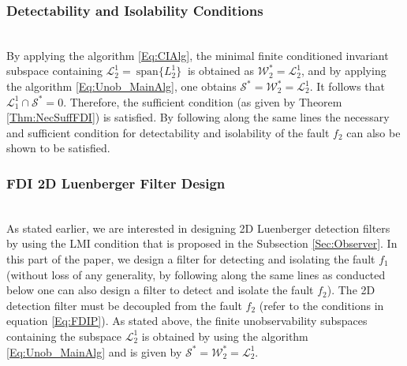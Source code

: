 \documentclass[journal,12pt,draftcls,onecolumn]{IEEEtran}
\newcommand{\ssp}[1]{\mathscr{#1}}      \newcommand{\setssp}[1]{\mathfrak{#1}}   \newcommand{\fld}[1]{\mathbb{#1}}       \newcommand{\op}[1]{\mathcal{#1}}       \newcommand{\sumbanach}[1]{\sum{#1}}
\newcommand{\spanset}[1]{\ \mathrm{span}\{#1\}\ } \newcommand{\idv}{{\bf x}_{-\infty}^\infty}				\newcommand{\fdv}{{\bf x}}
\begin{document}
\subsubsection{Detectability and Isolability Conditions}\ \\
By applying the algorithm \eqref{Eq:CIAlg}, the minimal finite conditioned invariant subspace containing $\ssp{L_2^1}=\spanset{L_2^1}$ is obtained as $\ssp{W}_{2}^* = \ssp{L}_2^1$, and by applying the algorithm \eqref{Eq:Unob_MainAlg}, one obtains $\op{S}^*=\ssp{W}_{2}^*=\ssp{L}_2^1$. It follows that $\ssp{L}_1^1\cap\op{S}^* =0$. Therefore, the sufficient condition (as given by Theorem \ref{Thm:NecSuffFDI}) is satisfied. By following along the same lines the necessary and sufficient condition for detectability and isolability of the fault $f_2$ can also be shown to be satisfied.


\subsubsection{FDI 2D Luenberger Filter Design}\ \\
As stated earlier, we are interested in designing 2D Luenberger detection filters by using the LMI condition that is proposed in the Subsection \ref{Sec:Observer}. In this part of the paper, we design a filter for detecting and isolating the fault $f_1$ (without loss of any generality, by following along the same lines as conducted below one can also design a filter to detect and isolate the fault $f_2$). The 2D detection filter must be decoupled from the fault $f_2$ (refer to the conditions in equation \eqref{Eq:FDIP}). As stated above, the finite unobservability subspaces containing the subspace $\ssp{L}_2^1$ is obtained by using the algorithm \eqref{Eq:Unob_MainAlg} and is given by $\op{S}^{*} = \mathscr{W}_{2}^{*}=\ssp{L}_2^1$.
\end{document}
